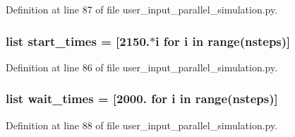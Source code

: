 Definition at line 87 of file user\-\_\-input\-\_\-parallel\-\_\-simulation.\-py.

\hypertarget{namespaceuser__input__parallel__simulation_a377a515511d37e8c7ac5501847d6485d}{
\subsubsection[{start\-\_\-times}]{\setlength{\rightskip}{0pt plus 5cm}list start\-\_\-times = \mbox{[}2150.$\ast$i for i in range({\bf nsteps})\mbox{]}}}\label{namespaceuser__input__parallel__simulation_a377a515511d37e8c7ac5501847d6485d}


Definition at line 86 of file user\-\_\-input\-\_\-parallel\-\_\-simulation.\-py.

\hypertarget{namespaceuser__input__parallel__simulation_ae584b229c7b1ea3d8330e6038884ffd3}{
\subsubsection[{wait\-\_\-times}]{\setlength{\rightskip}{0pt plus 5cm}list wait\-\_\-times = \mbox{[}2000. for i in range({\bf nsteps})\mbox{]}}}\label{namespaceuser__input__parallel__simulation_ae584b229c7b1ea3d8330e6038884ffd3}


Definition at line 88 of file user\-\_\-input\-\_\-parallel\-\_\-simulation.\-py.

